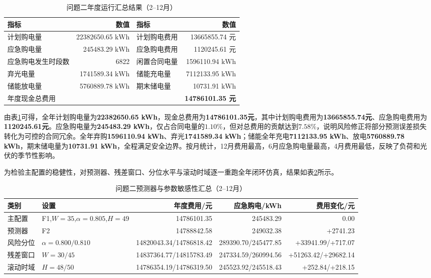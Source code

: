\begin{table}[htbp]
\centering
\caption{问题二年度运行汇总结果（2--12月）}
\label{tab:q2_result_sum}
\scriptsize
\begin{tabular}{@{}p{}r@{\quad}p{}r@{}}
\toprule
指标 & 数值 & 指标 & 数值 \\ 
\midrule
计划购电量 & 22382650.65 $\mathrm{kWh}$ & 计划购电费用 & 13665855.74 元 \\ 
应急购电量 & 245483.29 $\mathrm{kWh}$ & 应急购电费用 & 1120245.61 元 \\ 
应急购电发生时段数 & 6822 & 闲置合同电量 & 1596110.94 $\mathrm{kWh}$ \\
弃光电量 & 1741589.34 $\mathrm{kWh}$ & 储能充电量 & 7112133.95 $\mathrm{kWh}$ \\ 
储能放电量 & 5760889.78 $\mathrm{kWh}$ & 期末储电量 & 10731.91 $\mathrm{kWh}$ \\ 
\multicolumn{3}{l}{年度现金总费用} & \textbf{14786101.35 元} \\ 
\bottomrule
\end{tabular}
\end{table}

由表\ref{tab:q2_result_sum}可得，全年计划购电量为\textbf{22382650.65 kWh}，现金总费用为\textbf{14786101.35元}，其中计划购电费用为\textbf{13665855.74元}、应急购电费用为\textbf{1120245.61元}。应急购电量为\textbf{245483.29 kWh}，仅占合同电量的$1.10\%$，但对总费用的贡献达到$7.58\%$，说明风险修正将部分预测误差损失转化为可控的合同冗余。全年弃购\textbf{1596110.94 kWh}、弃光\textbf{1741589.34 kWh}；储能全年充电\textbf{7112133.95 kWh}、放电\textbf{5760889.78 kWh}，期末储电量为\textbf{10731.91 kWh}，全程满足安全边界。按月统计，12月费用最高，6月应急购电量最高，4月费用最低，反映了负荷和光伏的季节性影响。

为检验主配置的稳健性，对预测器、残差窗口、分位水平与滚动时域逐一重跑全年闭环仿真，结果如表\ref{tab:q2_sensitivity}所示。

\begin{table}[htbp]
\centering
\caption{问题二预测器与参数敏感性汇总（2--12月）}
\label{tab:q2_sensitivity}
\scriptsize
\setlength{\tabcolsep}{3.5pt}
\begin{tabular}{llrrr}
\toprule
类别 & 设置 & 年度费用/元 & 应急购电/kWh & 费用变化/元 \\
\midrule
主配置 & F1,$W=35$,$\alpha=0.805$,$H=49$ & 14786101.35 & 245483.29 & 0.00 \\
预测器 & F2 & 14788842.58 & 249032.38 & +2741.23 \\
风险分位 & $\alpha=0.800/0.810$ & 14820043.34/14786818.42 & 289390.70/245477.85 & +33941.99/+717.07 \\
残差窗口 & $W=30/45$ & 14837364.77/14815783.49 & 247334.59/260994.56 & +51263.42/+29682.14 \\
滚动时域 & $H=48/50$ & 14786354.19/14786319.50 & 245523.92/245518.43 & +252.84/+218.15 \\
\bottomrule
\end{tabular}
\end{table}

